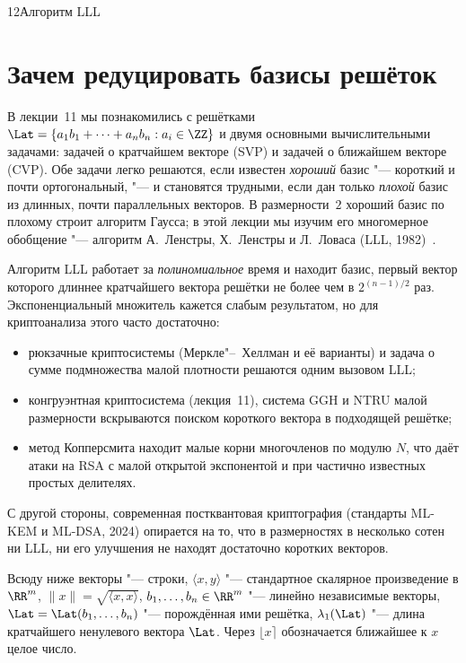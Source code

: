 \begin{lecture}{12}{Алгоритм LLL}

\section{Зачем редуцировать базисы решёток}

В лекции~11 мы познакомились с решётками $\Lat = \{a_1 b_1 + \cdots + a_n b_n : a_i \in \ZZ\}$
и двумя основными вычислительными задачами: задачей о кратчайшем векторе (SVP) и задачей
о ближайшем векторе (CVP). Обе задачи легко решаются, если известен \emph{хороший} базис "---
короткий и почти ортогональный, "--- и становятся трудными, если дан только \emph{плохой}
базис из длинных, почти параллельных векторов. В размерности~$2$ хороший базис по плохому
строит алгоритм Гаусса; в этой лекции мы изучим его многомерное обобщение "--- алгоритм
А.~Ленстры, Х.~Ленстры и Л.~Ловаса (LLL, 1982)~\cite{lll}.

Алгоритм LLL работает за \emph{полиномиальное} время и находит базис, первый вектор которого
длиннее кратчайшего вектора решётки не более чем в $2^{(n-1)/2}$ раз. Экспоненциальный
множитель кажется слабым результатом, но для криптоанализа этого часто достаточно:
\begin{itemize}
  \item рюкзачные криптосистемы (Меркле"--~Хеллман и её варианты) и задача о сумме подмножества
    малой плотности решаются одним вызовом LLL;
  \item конгруэнтная криптосистема (лекция~11), система GGH и NTRU малой размерности
    вскрываются поиском короткого вектора в подходящей решётке;
  \item метод Копперсмита находит малые корни многочленов по модулю $N$, что даёт атаки на RSA
    с малой открытой экспонентой и при частично известных простых делителях.
\end{itemize}
С другой стороны, современная постквантовая криптография (стандарты ML-KEM и ML-DSA, 2024)
опирается на то, что в размерностях в несколько сотен ни LLL, ни его улучшения не находят
достаточно коротких векторов.

Всюду ниже векторы "--- строки, $\langle x, y\rangle$ "--- стандартное скалярное
произведение в $\RR^m$, $\|x\| = \sqrt{\langle x, x \rangle}$, $b_1, \dots, b_n \in \RR^m$ "---
линейно независимые векторы, $\Lat = \Lat(b_1, \dots, b_n)$ "--- порождённая ими решётка,
$\lambda_1(\Lat)$ "--- длина кратчайшего ненулевого вектора $\Lat$. Через
$\lfloor x \rceil$ обозначается ближайшее к $x$ целое число.


\end{lecture}
